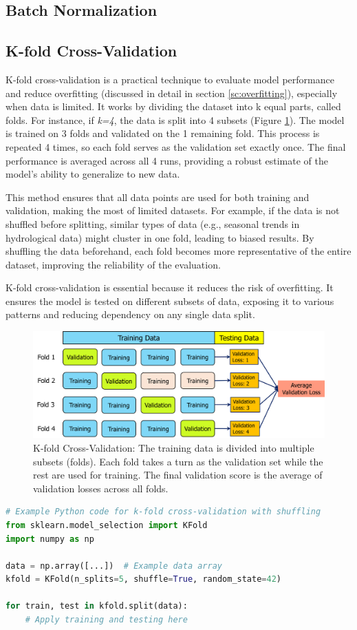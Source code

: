 \subsection{Batch Normalization}
\subsection{K-fold Cross-Validation}
K-fold cross-validation is a practical technique to evaluate model performance and reduce overfitting (discussed in detail in section \ref{sc:overfitting}), especially when data is limited. It works by dividing the dataset into k equal parts, called folds. For instance, if \textit{k=4}, the data is split into 4 subsets (Figure \ref{fig:kfold}). The model is trained on 3 folds and validated on the 1 remaining fold. This process is repeated 4 times, so each fold serves as the validation set exactly once. The final performance is averaged across all 4 runs, providing a robust estimate of the model's ability to generalize to new data.

This method ensures that all data points are used for both training and validation, making the most of limited datasets. For example, if the data is not shuffled before splitting, similar types of data (e.g., seasonal trends in hydrological data) might cluster in one fold, leading to biased results. By shuffling the data beforehand, each fold becomes more representative of the entire dataset, improving the reliability of the evaluation.

K-fold cross-validation is essential because it reduces the risk of overfitting. It ensures the model is tested on different subsets of data, exposing it to various patterns and reducing dependency on any single data split.



\begin{figure}[h!]
    \centering
    \includegraphics[width=\linewidth]{images/k-foldcrossval.png}
    \caption{K-fold Cross-Validation: The training data is divided into multiple subsets (folds). Each fold takes a turn as the validation set while the rest are used for training. The final validation score is the average of validation losses across all folds.}
    \label{fig:kfold}
\end{figure}


\begin{lstlisting}[language=Python]
# Example Python code for k-fold cross-validation with shuffling
from sklearn.model_selection import KFold
import numpy as np

data = np.array([...])  # Example data array
kfold = KFold(n_splits=5, shuffle=True, random_state=42)

for train, test in kfold.split(data):
    # Apply training and testing here
\end{lstlisting}